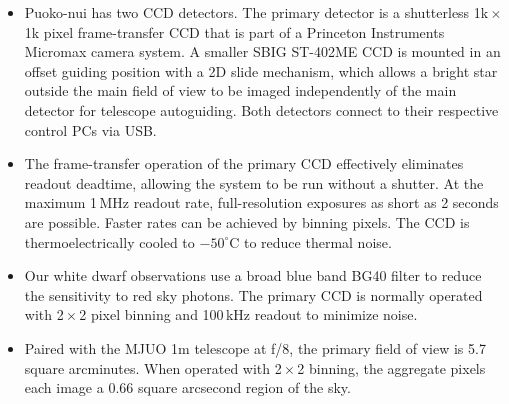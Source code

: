 \vspace{-1.75cm}
\begin{itemize}[itemsep=20pt]
	
\item[] Puoko-nui has two CCD detectors. The primary detector is a shutterless
1k\,$\times$\,1k pixel frame-transfer CCD that is part of a Princeton Instruments
Micromax camera system.  A smaller SBIG ST-402ME CCD is mounted in an
offset guiding position with a 2D slide mechanism, which allows a bright star
outside the main field of view to be imaged independently of the main detector
for telescope autoguiding. Both detectors connect to their respective control PCs
via USB.

\item[] The frame-transfer operation of the primary CCD effectively eliminates
readout deadtime, allowing the system to be run without a shutter. At the
maximum 1\,MHz readout rate, full-resolution exposures as short as 2 seconds
are possible. Faster rates can be achieved by binning pixels. The CCD is
thermoelectrically cooled to $-50^\circ$C to reduce thermal noise.

\item[] Our white dwarf observations use a broad blue band
BG40 filter to reduce the sensitivity to red sky photons.
The primary CCD is normally operated with 2\,$\times$\,2 pixel binning and 100\,kHz 
readout to minimize noise. 

\item[] Paired with the MJUO 1m telescope at f/8, the primary field of view is
5.7 square arcminutes. When operated with 2\,$\times$\,2 binning, the aggregate
pixels each image a 0.66 square arcsecond region of the sky.

\end{itemize}
\vspace{-1.75cm}